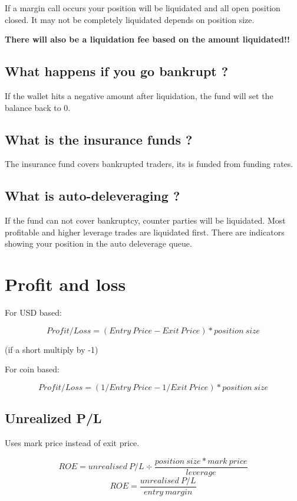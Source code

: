 \documentclass[11pt]{scrartcl} %
\begin{document}
If a margin call occurs your position will be liquidated and all open position closed. It may not be
completely liquidated depends on position size.

\textbf{There will also be a liquidation fee based on the amount liquidated!!}

\subsection{What happens if you go bankrupt ?}

If the wallet hits a negative amount after liquidation, the fund will set the balance back to 0.

\subsection{What is the insurance funds ?}

The insurance fund covers bankrupted traders, its is funded from funding rates.

\subsection{What is auto-deleveraging ?}

If the fund can not cover bankruptcy, counter parties will be liquidated. Most profitable and higher
leverage trades are liquidated first. There are indicators showing your position in the auto deleverage
queue.

\section{Profit and loss}

For USD based:

\[ Profit/Loss = (Entry\:Price - Exit\:Price)* position\:size \]

(if a short multiply by -1)

For coin based:

\[ Profit/Loss = (1/Entry\:Price - 1/Exit\:Price) * position\:size \]

\subsection{Unrealized P/L}

Uses mark price instead of exit price. 

\[ ROE = unrealised\:P/L \div \frac{position\:size * mark\:price}{leverage} \]
\[ ROE = \frac{unrealised\:P/L}{entry\:margin} \] 
\end{document}
